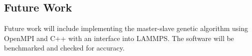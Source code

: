 \documentclass[letterpaper, 12pt]{article}
\begin{document}
\begin{flushleft}
\section*{Future Work}
Future work will include implementing the master-slave genetic algorithm using OpenMPI and C++ with an interface into LAMMPS.  The software will be benchmarked and checked for accuracy.
\newpage
\printbibliography

\end{flushleft}
\end{document}

